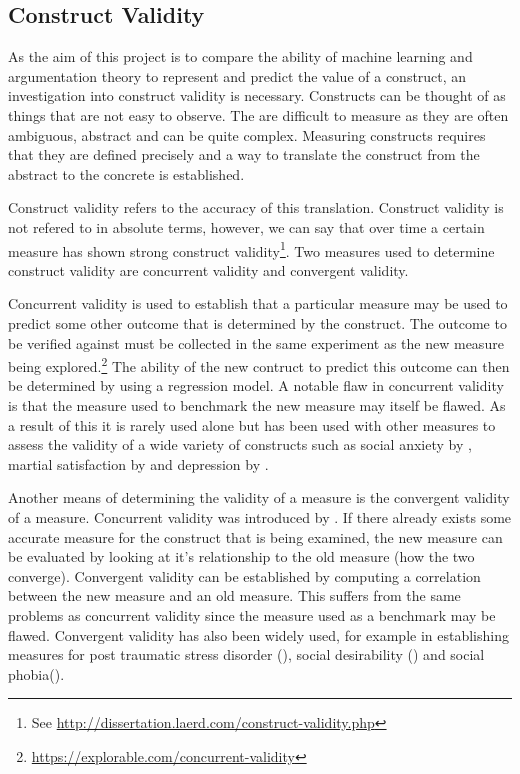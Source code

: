 \subsection{Construct Validity}

As the aim of this project is to compare the ability of machine learning and argumentation theory to represent and predict the value of a construct, an investigation into construct validity is necessary. Constructs can be thought of as things that are not easy to observe. The are difficult to measure as they are often ambiguous, abstract and can be quite complex. Measuring constructs requires that they are defined precisely and a way to translate the construct from the abstract to the concrete is established.

Construct validity refers to the accuracy of this translation. Construct validity is not refered to in absolute terms, however, we can say that over time a certain measure has shown strong construct validity\footnote{See \url{http://dissertation.laerd.com/construct-validity.php}}. Two measures used to determine construct validity are concurrent validity and convergent validity.

Concurrent validity is used to establish that a particular measure may be used to predict some other outcome that is determined by the construct. The outcome to be verified against must be collected in the same experiment as the new measure being explored.\footnote{\url{https://explorable.com/concurrent-validity}} The ability of the new contruct to predict this outcome can then be determined by using a regression model. A notable flaw in concurrent validity is that the measure used to benchmark the new measure may itself be flawed. As a result of this it is rarely used alone but has been used with other measures to assess the validity of a wide variety of constructs such as social anxiety by \cite{la1993social}, martial satisfaction by \cite{schumm1986concurrent} and depression by \cite{storch2004factor}.

Another means of determining the validity of a measure is the convergent validity of a measure. Concurrent validity was introduced by \cite{campbell1959convergent}. If there already exists some accurate measure for the construct that is being examined, the new measure can be evaluated by looking at it's relationship to the old measure (how the two converge). Convergent validity can be established by computing a correlation between the new measure and an old measure. This suffers from the same problems as concurrent validity since the measure used as a benchmark may be flawed. Convergent validity has also been widely used, for example in establishing measures for post traumatic stress disorder (\cite{neal1994convergent}), social desirability (\cite{stober2001social}) and social phobia(\cite{beidel1996assessment}).

